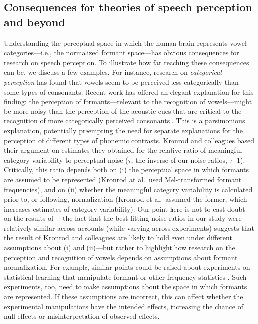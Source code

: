 \documentclass[preprint]{JASA}
\begin{document}
\subsection{Consequences for theories of speech perception and beyond}\label{consequences-for-theories-of-speech-perception-and-beyond}

Understanding the perceptual space in which the human brain represents vowel categories---i.e., the normalized formant space---has obvious consequences for research on speech perception. To illustrate how far reaching these consequences can be, we discuss a few examples. For instance, research on \emph{categorical perception} has found that vowels seem to be perceived less categorically than some types of consonants. Recent work has offered an elegant explanation for this finding: the perception of formants---relevant to the recognition of vowels---might be more noisy than the perception of the acoustic cues that are critical to the recognition of more categorically perceived consonants \citep{kronrod2016}. This is a parsimonious explanation, potentially preempting the need for separate explanations for the perception of different types of phonemic contrasts. Kronrod and colleagues based their argument on estimates they obtained for the relative ratio of meaningful category variability to perceptual noise (\(\tau\), the inverse of our noise ratios, \(\tau^-1\)). Critically, this ratio depends both on (i) the perceptual space in which formants are assumed to be represented (Kronrod at al.~used Mel-transformed formant frequencies), and on (ii) whether the meaningful category variability is calculated prior to, or following, normalization (Kronrod et al.~assumed the former, which increases estimates of category variability). Our point here is not to cast doubt on the results of \citet{kronrod2016} ---the fact that the best-fitting noise ratios in our study were relatively similar across accounts (while varying across experiments) suggests that the result of Kronrod and colleagues are likely to hold even under different assumptions about (i) and (ii)---but rather to highlight how research on the perception and recognition of vowels depends on assumptions about formant normalization. For example, similar points could be raised about experiments on statistical learning that manipulate formant or other frequency statistics \citep[e.g.,][]{chladkova2017, colby2018, xie2021, wade2007}. Such experiments, too, need to make assumptions about the space in which formants are represented. If these assumptions are incorrect, this can affect whether the experimental manipulations have the intended effects, increasing the chance of null effects or misinterpretation of observed effects.
\end{document}
